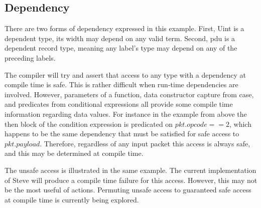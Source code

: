 \subsection{Dependency}

There are two forms of dependency expressed in this example. First, Uint is a 
dependent type, its width may depend on any valid term. Second, pdu is a
dependent record type, meaning any label's type may depend on any of the
preceding labels. 

The compiler will try and assert that access to any type with a dependency at
compile time is safe. This is rather difficult when run-time dependencies are
involved. However, parameters of a function, data constructor capture from case,
and predicates from conditional expressions all provide some compile time
information regarding data values. For instance in the example from above the 
then block of the condition expression is predicated on $pkt.opcode == 2$, which
happens to be the same dependency that must be satisfied for safe access to 
$pkt.payload$. Therefore, regardless of any input packet this access is always
safe, and this may be determined at compile time.

The unsafe access is illustrated in the same example. The current implementation
of Steve will produce a compile time failure for this access. However, this may
not be the most useful of actions. Permuting unsafe access to guaranteed safe
access at compile time is currently being explored.
